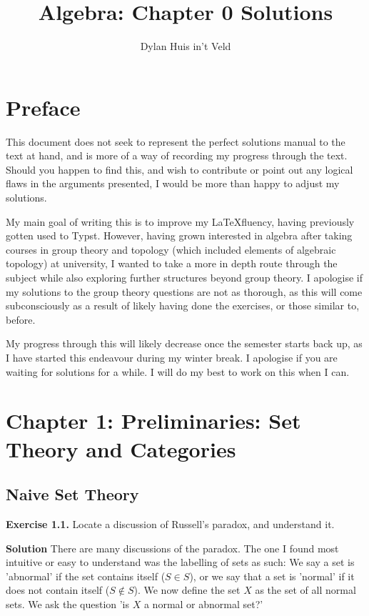 \documentclass[titlepage]{article}
\title{Algebra: Chapter 0 Solutions}
\author{Dylan Huis in't Veld}
\begin{document}
\maketitle
\tableofcontents

\newpage

\section*{Preface}

This document does not seek to represent the perfect solutions manual to the text at hand, and is more of a way of recording my progress through the text. Should you happen to find this, and wish to contribute or point out any logical flaws in the arguments presented, I would be more than happy to adjust my solutions.

My main goal of writing this is to improve my \LaTeX fluency, having previously gotten used to Typst. However, having grown interested in algebra after taking courses in group theory and topology (which included elements of algebraic topology) at university, I wanted to take a more in depth route through the subject while also exploring further structures beyond group theory. I apologise if my solutions to the group theory questions are not as thorough, as this will come subconsciously as a result of likely having done the exercises, or those similar to, before.

My progress through this will likely decrease once the semester starts back up, as I have started this endeavour during my winter break. I apologise if you are waiting for solutions for a while. I will do my best to work on this when I can.
\newpage

\section{Chapter 1: Preliminaries: Set Theory and Categories}
\subsection{Naive Set Theory}

\textbf{Exercise 1.1.} Locate a discussion of Russell's paradox, and understand it.

\medskip

\textbf{Solution} There are many discussions of the paradox. The one I found most intuitive or easy to understand was the labelling of sets as such: We say a set is 'abnormal' if the set contains itself ($S \in S$), or we say that a set is 'normal' if it does not contain itself ($S \notin S$). We now define the set $X$ as the set of all normal sets. We ask the question 'is $X$ a normal or abnormal set?'
\end{document}
